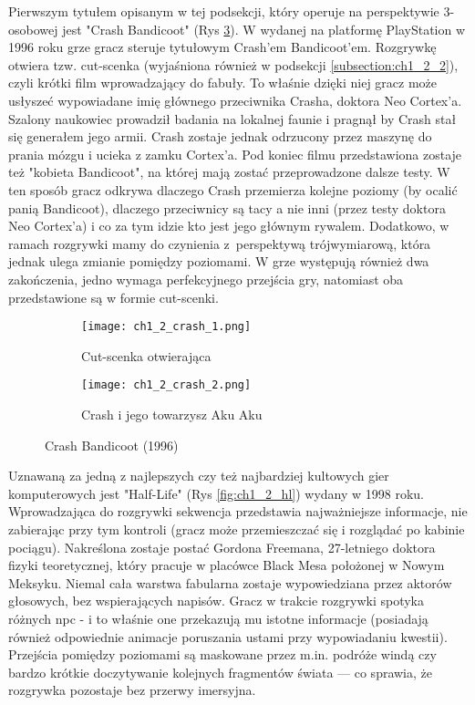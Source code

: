 Pierwszym tytułem opisanym w tej podsekcji, który operuje na perspektywie 3-osobowej jest
"Crash Bandicoot" (Rys \ref{fig:ch1_2_crash}). W wydanej na platformę PlayStation w 1996 roku grze
gracz steruje tytułowym Crash'em Bandicoot'em. Rozgrywkę otwiera tzw. cut-scenka (wyjaśniona również w
podsekcji \ref{subsection:ch1_2_2}), czyli krótki film wprowadzający do fabuły. To właśnie dzięki niej
gracz może usłyszeć wypowiadane imię głównego przeciwnika Crasha, doktora Neo Cortex'a.
Szalony naukowiec prowadził badania na lokalnej faunie i pragnął by Crash
stał się generałem jego armii. Crash zostaje jednak odrzucony przez maszynę do prania mózgu i ucieka
z zamku Cortex'a. Pod koniec filmu przedstawiona zostaje też "kobieta Bandicoot", na której mają zostać
przeprowadzone dalsze testy. W ten sposób gracz odkrywa dlaczego Crash przemierza kolejne poziomy (by ocalić
panią Bandicoot), dlaczego przeciwnicy są tacy a nie inni (przez testy doktora Neo Cortex'a) i co za tym
idzie kto jest jego głównym rywalem. Dodatkowo, w ramach rozgrywki mamy do czynienia z~perspektywą
trójwymiarową, która jednak ulega zmianie pomiędzy poziomami. W grze występują również dwa zakończenia,
jedno wymaga perfekcyjnego przejścia gry, natomiast oba przedstawione są w formie cut-scenki.

\begin{figure}[h]
    \begin{subfigure}{0.49\textwidth}
        \caption{Cut-scenka otwierająca}
        \texttt{[image: ch1\_2\_crash\_1.png]}
        \label{subfig:ch_1_2_crash_1}
    \end{subfigure}
    \begin{subfigure}{0.49\textwidth}
        \caption{Crash i jego towarzysz Aku Aku}
        \texttt{[image: ch1\_2\_crash\_2.png]}
        \label{subfig:ch_1_2_crash_2}
    \end{subfigure}
    \caption{Crash Bandicoot (1996)}
    \label{fig:ch1_2_crash}
\end{figure}

Uznawaną za jedną z najlepszych czy też najbardziej kultowych gier komputerowych jest
"Half-Life" (Rys \ref{fig:ch1_2_hl}) wydany w 1998 roku.
Wprowadzająca do rozgrywki sekwencja przedstawia najważniejsze informacje, nie zabierając
przy tym kontroli (gracz może przemieszczać się i rozglądać po kabinie pociągu). Nakreślona zostaje
postać Gordona Freemana, 27-letniego doktora fizyki teoretycznej, który pracuje w placówce Black Mesa
położonej w Nowym Meksyku. Niemal cała warstwa fabularna zostaje wypowiedziana przez aktorów głosowych,
bez wspierających napisów. Gracz w trakcie rozgrywki spotyka różnych \gls{npc} - i to właśnie one
przekazują mu istotne informacje (posiadają również odpowiednie animacje poruszania ustami przy
wypowiadaniu kwestii). Przejścia pomiędzy poziomami są maskowane przez m.in. podróże windą czy
bardzo krótkie doczytywanie kolejnych fragmentów świata --- co sprawia, że rozgrywka pozostaje
bez przerwy imersyjna.

